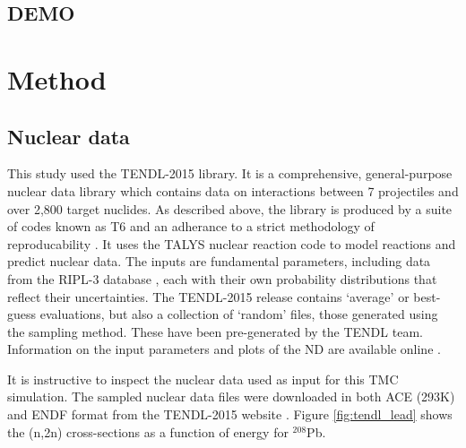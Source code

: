 \subsection{DEMO}

\section{Method}

\subsection{Nuclear data}
\label{sec:data}
This study used the TENDL-2015 library. It is a comprehensive, general-purpose nuclear data library which contains data on interactions between 7 projectiles and over 2,800 target nuclides. As described above, the library is produced by a suite of codes known as T6 and an adherance to a strict methodology of reproducability \cite{Rochman2016}. It uses the TALYS nuclear reaction code to model reactions and predict nuclear data. The inputs are fundamental parameters, including data from the RIPL-3 database \cite{RIPL3}, each with their own probability distributions that reflect their uncertainties. The TENDL-2015 release contains `average' or best-guess evaluations, but also a collection of `random' files, those generated using the sampling method. These have been pre-generated by the TENDL team. Information on the input parameters and plots of the ND are available online \cite{TENDL2015}.

It is instructive to inspect the nuclear data used as input for this TMC simulation. The sampled nuclear data files were downloaded in both ACE (293K) and ENDF format from the TENDL-2015 website \cite{TENDL2015}. Figure \ref{fig:tendl_lead} shows the (n,2n) cross-sections as a function of energy for $^{208}$Pb. 


